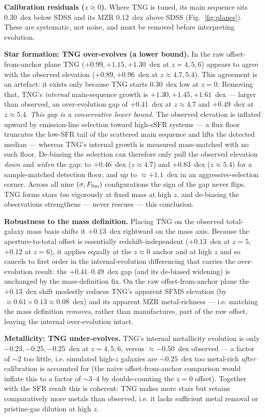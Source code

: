 \documentclass[twocolumn]{aastex631}
\begin{document}
\textbf{Calibration residuals ($z\approx0$).} Where TNG is tuned, its main sequence sits $0.30$~dex below SDSS and its MZR $0.12$~dex above SDSS (Fig.~\ref{fig:planes}). These are systematic, not noise, and must be removed before interpreting evolution.

\textbf{Star formation: TNG over-evolves (a lower bound).} In the raw offset-from-anchor plane TNG ($+0.99,+1.15,+1.30$~dex at $z=4,5,6$) appears to agree with the observed elevation ($+0.89,+0.96$~dex at $z\approx4.7,5.4$). This agreement is an artefact: it exists only because TNG starts $0.30$~dex low at $z=0$. Removing that, TNG's \emph{internal} main-sequence growth is $+1.30,+1.45,+1.61$~dex --- larger than observed, an over-evolution gap of $+0.41$~dex at $z\approx4.7$ and $+0.49$~dex at $z\approx5.4$. \emph{This gap is a conservative lower bound.} The observed elevation is inflated upward by emission-line selection toward high-sSFR systems --- a flux floor truncates the low-SFR tail of the scattered main sequence and lifts the detected median --- whereas TNG's internal growth is measured mass-matched with no such floor. De-biasing the selection can therefore only pull the observed elevation \emph{down} and \emph{widen} the gap: to $+0.46$~dex ($z\approx4.7$) and $+0.83$~dex ($z\approx5.4$) for a sample-matched detection floor, and up to $\approx+1.1$~dex in an aggressive-selection corner. Across all nine $(\sigma,F_{\rm lim})$ configurations the sign of the gap never flips. TNG forms stars \emph{too} vigorously at fixed mass at high $z$, and de-biasing the observations strengthens --- never rescues --- this conclusion.

\textbf{Robustness to the mass definition.} Placing TNG on the observed total-galaxy mass basis shifts it $+0.13$~dex rightward on the mass axis. Because the aperture-to-total offset is essentially redshift-independent ($+0.13$~dex at $z=5$, $+0.12$ at $z=6$), it applies equally at the $z\approx0$ anchor and at high $z$ and so cancels to first order in the internal-evolution differencing that carries the over-evolution result: the $+0.41$--$0.49$~dex gap (and its de-biased widening) is unchanged by the mass-definition fix. On the raw offset-from-anchor plane the $+0.13$~dex shift modestly reduces TNG's apparent SFMS elevation (by $\approx0.61\times0.13\approx0.08$~dex) and its apparent MZR metal-richness --- i.e. matching the mass definition \emph{removes}, rather than manufactures, part of the raw offset, leaving the internal over-evolution intact.

\textbf{Metallicity: TNG under-evolves.} TNG's internal metallicity evolution is only $-0.23,-0.25,-0.25$~dex at $z=4,5,6$, versus $\approx-0.50$~dex observed --- a factor of $\sim2$ too little, i.e. simulated high-$z$ galaxies are $\sim0.25$~dex too metal-rich \emph{after} calibration is accounted for (the naive offset-from-anchor comparison would inflate this to a factor of $\sim3$--$4$ by double-counting the $z=0$ offset). Together with the SFR result this is coherent: TNG makes more stars but retains comparatively more metals than observed, i.e. it lacks sufficient metal removal or pristine-gas dilution at high $z$.
\end{document}
